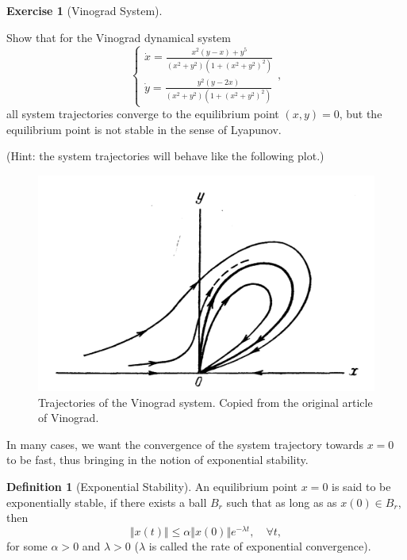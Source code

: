 \documentclass[
]{book}
\theoremstyle{definition}
\newtheorem{definition}{Definition}[chapter]
\theoremstyle{definition}
\theoremstyle{definition}
\newtheorem{exercise}{Exercise}[chapter]
\theoremstyle{definition}
\theoremstyle{remark}
\begin{document}
\begin{exercise}[Vinograd System]
\protect\hypertarget{exr:vinogradequation}{}\label{exr:vinogradequation}

Show that for the Vinograd dynamical system \citep{vinograd57-inapplicability}
\[
\begin{cases}
\dot{x} = \frac{x^2(y-x) + y^5}{(x^2+y^2)(1 + (x^2+y^2)^2)} \\
\dot{y} = \frac{y^2 (y - 2x)}{(x^2+y^2)(1 + (x^2+y^2)^2)}
\end{cases},
\]
all system trajectories converge to the equilibrium point \((x,y) = 0\), but the equilibrium point is not stable in the sense of Lyapunov.

(Hint: the system trajectories will behave like the following plot.)

\begin{figure}

{\centering \includegraphics[width=0.6\linewidth]{images/vinograd} 

}

\caption{Trajectories of the Vinograd system. Copied from the original article of Vinograd.}\label{fig:vinograd-system}
\end{figure}

\end{exercise}

In many cases, we want the convergence of the system trajectory towards \(x=0\) to be fast, thus bringing in the notion of exponential stability.

\begin{definition}[Exponential Stability]
\protect\hypertarget{def:exponentialstability}{}\label{def:exponentialstability}An equilibrium point \(x=0\) is said to be exponentially stable, if there exists a ball \(B_r\) such that as long as as \(x(0) \in B_r\), then
\[
\Vert x(t) \Vert \leq \alpha \Vert x(0) \Vert e^{-\lambda t}, \quad \forall t,
\]
for some \(\alpha > 0\) and \(\lambda > 0\) (\(\lambda\) is called the rate of exponential convergence).
\end{definition}
\end{document}
